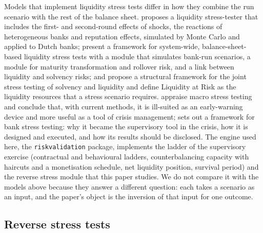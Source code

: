 Models that implement liquidity stress tests differ in how they combine the run scenario with the rest of the balance sheet. \citet{vandenend2009} proposes a liquidity stress-tester that includes the first- and second-round effects of shocks, the reactions of heterogeneous banks and reputation effects, simulated by Monte Carlo and applied to Dutch banks; \citet{puhr2012} present a framework for system-wide, balance-sheet-based liquidity stress tests with a module that simulates bank-run scenarios, a module for maturity transformation and rollover risk, and a link between liquidity and solvency risks; and \citet{cont2020} propose a structural framework for the joint stress testing of solvency and liquidity and define Liquidity at Risk as the liquidity resources that a stress scenario requires. \citet{borio2014} appraise macro stress testing and conclude that, with current methods, it is ill-suited as an early-warning device and more useful as a tool of crisis management; \citet{schuermann2014} sets out a framework for bank stress testing: why it became the supervisory tool in the crisis, how it is designed and executed, and how its results should be disclosed. The engine used here, the \texttt{riskvalidation} package, implements the ladder of the supervisory exercise (contractual and behavioural ladders, counterbalancing capacity with haircuts and a monetisation schedule, net liquidity position, survival period) and the reverse stress module that this paper studies. We do not compare it with the models above because they answer a different question: each takes a scenario as an input, and the paper's object is the inversion of that input for one outcome.

\subsection{Reverse stress tests}

